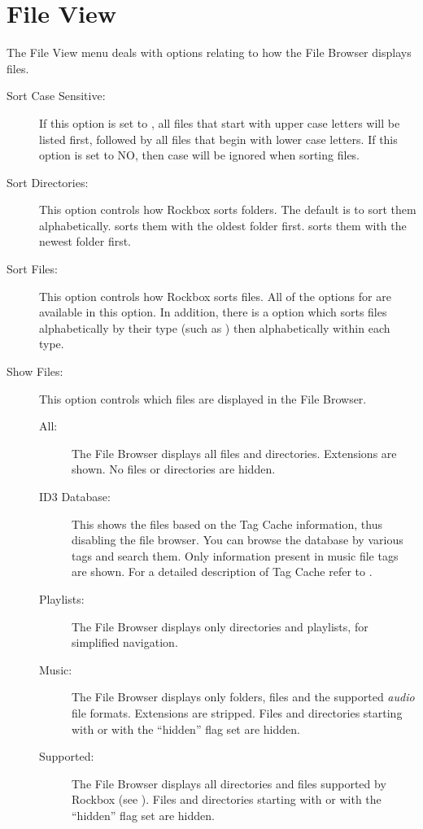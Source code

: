 \section{File View}
The File View menu deals with options relating to how the File Browser 
displays files.
%
\begin{description}
\item[Sort Case Sensitive:]
  If this option is set to , all files that start with upper case 
  letters will be listed first, followed by all files that begin with lower 
  case letters.  If this option is set to NO, then case will be ignored when 
  sorting files.
\item[Sort Directories:]
  This option controls how Rockbox sorts folders.  The default is to sort 
  them alphabetically.  sorts them with the oldest folder first. 
   sorts them with the newest folder first.
  
\item[Sort Files:]
  This option controls how Rockbox sorts files.  All of the options for 
   are available in this option.  In addition, there 
  is a  option which sorts files alphabetically by their type 
  (such as ) then alphabetically within each type.
  
\item[\label{ref:ShowFiles}Show Files:]
  This option controls which files are displayed in the File Browser.
  \begin{description}
  \item[All:] The File Browser displays all files and directories. 
    Extensions are shown. No files or directories are hidden.
  \item[ID3 Database:] This shows the files based on the Tag Cache
    information, thus disabling the file browser. You can browse the
    database by various tags and search them. Only information present
    in music file tags are shown. For a detailed description of Tag Cache
    refer to .
  \item[Playlists:] The File Browser displays only directories and playlists,
    for simplified navigation.
  \item[Music:] The File Browser displays only folders,  files 
    and the supported \emph{audio} file formats.  Extensions are stripped.  
    Files and directories starting with  or with the ``hidden'' 
    flag set are hidden.
  \item[Supported:] The File Browser displays all directories and files 
    supported by Rockbox (see ).  
    Files and directories starting with  or with the ``hidden'' 
    flag set are hidden.
  \end{description}
  

\end{description}
